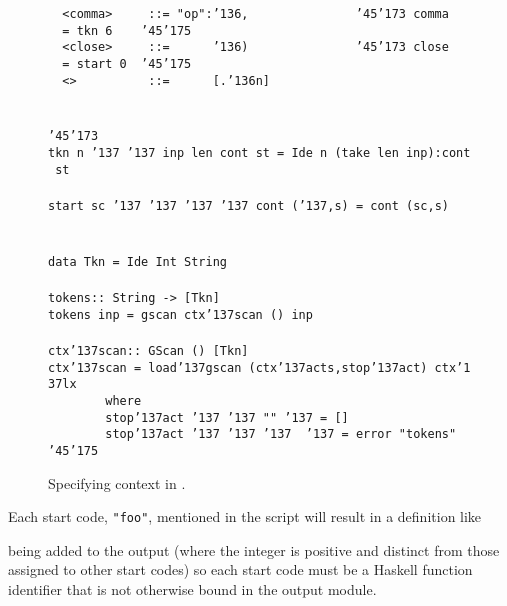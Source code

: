 \begin{figure}
{\mbox{\tt \ \ <comma>\ \ \ \ \ ::=\ "op":{\char'136},\ \ \ \ \ \ \ \ \ \ \ \ \ \ \ {\char'45}{\char'173}\ comma\ \ \ \ \ =\ tkn\ 6\ \ \ \ {\char'45}{\char'175}}\\
\mbox{\tt \ \ <close>\ \ \ \ \ ::=\ \ \ \ \ \ {\char'136})\ \ \ \ \ \ \ \ \ \ \ \ \ \ \ {\char'45}{\char'173}\ close\ \ \ \ \ =\ start\ 0\ \ {\char'45}{\char'175}}\\
\mbox{\tt \ \ <>\ \ \ \ \ \ \ \ \ \ ::=\ \ \ \ \ \ [.{\char'136}n]}\\
\mbox{\tt }\\[-4pt]
\mbox{\tt }\\[-4pt]
\mbox{\tt {\char'45}{\char'173}}\\
\mbox{\tt tkn\ n\ {\char'137}\ {\char'137}\ inp\ len\ cont\ st\ =\ Ide\ n\ (take\ len\ inp):cont\ st}\\
\mbox{\tt }\\[-4pt]
\mbox{\tt start\ sc\ {\char'137}\ {\char'137}\ {\char'137}\ {\char'137}\ cont\ ({\char'137},s)\ =\ cont\ (sc,s)}\\
\mbox{\tt }\\[-4pt]
\mbox{\tt }\\[-4pt]
\mbox{\tt data\ Tkn\ =\ Ide\ Int\ String}\\
\mbox{\tt }\\[-4pt]
\mbox{\tt tokens::\ String\ ->\ [Tkn]}\\
\mbox{\tt tokens\ inp\ =\ gscan\ ctx{\char'137}scan\ ()\ inp}\\
\mbox{\tt }\\[-4pt]
\mbox{\tt ctx{\char'137}scan::\ GScan\ ()\ [Tkn]}\\
\mbox{\tt ctx{\char'137}scan\ =\ load{\char'137}gscan\ (ctx{\char'137}acts,stop{\char'137}act)\ ctx{\char'137}lx}\\
\mbox{\tt \ \ \ \ \ \ \ \ where}\\
\mbox{\tt \ \ \ \ \ \ \ \ stop{\char'137}act\ {\char'137}\ {\char'137}\ ""\ {\char'137}\ =\ []}\\
\mbox{\tt \ \ \ \ \ \ \ \ stop{\char'137}act\ {\char'137}\ {\char'137}\ {\char'137}\ \ {\char'137}\ =\ error\ "tokens"}\\
\mbox{\tt {\char'45}{\char'175}}
}
\caption{Specifying context in \lx.}\label{fig-ctx}
\end{figure}

Each start code, \mbox{\tt "foo"}, mentioned in the script will result in a definition
like


being added to the output (where the integer is positive and distinct from
those assigned to other start codes) so each start code must be a Haskell
function identifier that is not otherwise bound in the output module.

